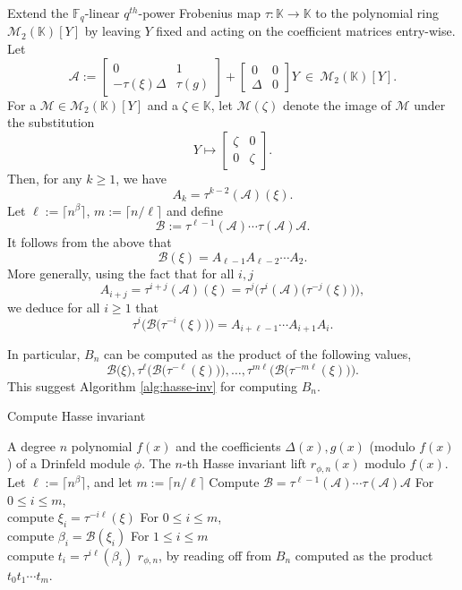 \documentclass{article}
\theoremstyle{plain}
\theoremstyle{definition}
\def\F{\ensuremath{\mathbb{F}}}
\def\K{\ensuremath{\mathbb{K}}}
\begin{document}
Extend the $\F_q$-linear $q^{th}$-power Frobenius map $\tau: \K \to \K$ to the polynomial ring $\mathscr{M}_2(\K)[Y]$ by leaving $Y$ fixed and acting on the coefficient matrices entry-wise.
Let
\[
\mathcal{A} := 
\begin{bmatrix}
0 & 1 \\
-\tau(\xi)\Delta & \tau(g)
\end{bmatrix}
+
\begin{bmatrix}
0 & 0 \\
\Delta & 0
\end{bmatrix} Y ~ \in ~ \mathscr{M}_2(\K)[Y].
\]
For a $\mathcal{M} \in \mathscr{M}_2(\K)[Y]$ and a $\zeta \in \K$, let $\mathcal{M}(\zeta)$ denote the image of $\mathcal{M}$ under the substitution 
\[Y \longmapsto 
\begin{bmatrix}
	\zeta & 0 \\
	0 & \zeta
\end{bmatrix}.
\]
Then, for any $k \ge 1$, we have $$A_k = \tau^{k - 2}(\mathcal{A})(\xi).$$
Let $\ell := \lceil n^\beta \rceil$, $m := \lceil n / \ell \rceil$ and define 
\[\mathcal{B} := \tau^{\ell-1}(\mathcal{A}) \cdots \tau(\mathcal{A}) \mathcal{A}.\]
It follows from the above that 
\[\mathcal{B}(\xi) = A_{\ell-1}A_{\ell - 2} \cdots A_2.\]
More generally, using the fact that for all $i, j$
\[A_{i + j} = \tau^{i + j}(\mathcal{A})(\xi) = \tau^j\Big(\tau^i(\mathcal{A})\big( \tau^{-j}(\xi)\big)\Big),\]
we deduce for all $i \ge 1$ that 
\[\tau^{i}\Big(\mathcal{B} \big( \tau^{-i}(\xi)\big) \Big) = A_{i + \ell-1} \cdots A_{i + 1}A_i.\]

In particular, $B_n$ can be computed as the product of the following values, 
\[
\mathcal{B} \big(\xi\big), \tau^{\ell}\Big(\mathcal{B} \big( \tau^{-\ell}(\xi)\big) \Big), \dots, 
\tau^{m \ell}\Big(\mathcal{B} \big( \tau^{-m \ell}(\xi)\big) \Big).
\]
This suggest Algorithm \ref{alg:hasse-inv} for computing $B_n$.

\begin{algorithm}[H]
	\caption{Compute Hasse invariant}
	\label{alg:hasse-inv}
	\begin{algorithmic}[1]
		\REQUIRE A degree $n$ polynomial $f(x)$ and the coefficients $\Delta(x), g(x)$ (modulo $f(x)$) of a Drinfeld module $\phi$.
		\ENSURE The $n$-th Hasse invariant lift $r_{\phi,n}(x)$ modulo $f(x)$.
		\STATE Let $\ell := \lceil n^\beta \rceil$, and let $m := \lceil n / \ell \rceil$
		\STATE\label{step:hasse-2}
		Compute $\mathcal{B} = \tau^{\ell-1}(\mathcal{A}) \cdots \tau(\mathcal{A}) \mathcal{A}$
		\STATE\label{step:hasse-3}
		For $0 \le i \le m$, \\
		compute $\xi_i = \tau^{-i\ell}(\xi)$
		\STATE\label{step:hasse-4}
		For $0 \le i \le m$, \\
		compute $\beta_i = \mathcal{B}(\xi_i)$
		\STATE\label{step:hasse-5}
		For $1 \le i \le m$ \\
		compute $t_i = \tau^{i\ell}(\beta_i)$
		\RETURN $r_{\phi,n}$, by reading off from $B_n$ computed as the product $t_0t_1 \cdots t_m$.
	\end{algorithmic}
\end{algorithm}
\end{document}
